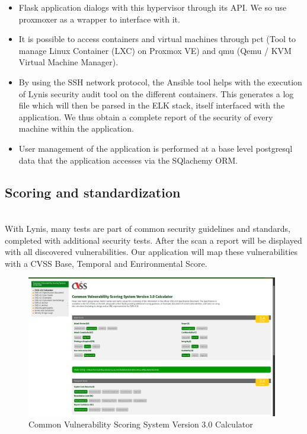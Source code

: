 \begin{itemize}
\item
  Flask application dialogs with this hypervisor through its API. We
  so use proxmoxer as a wrapper to interface with
  it.
\item
  It is possible to access containers and virtual machines through
  pct (Tool to manage Linux Container (LXC) on Proxmox VE) and
  qmu (Qemu / KVM Virtual Machine Manager).
\item
  By using the SSH network protocol, the Ansible tool helps with the execution of
  Lynis security audit tool on the different containers. This generates a
  log file which will then be parsed in the ELK stack, itself
  interfaced with the application. We thus obtain a complete report of the
  security of every machine within the application.
\item
  User management of the application is performed at a base level
  postgresql data that the application accesses via the SQlachemy ORM.
\end{itemize}


\pagebreak

\subsection{Scoring and standardization}

\vspace{1cm}
\\
With Lynis, many tests are part of common security guidelines and standards,
completed with additional security tests. After the scan a report will be displayed
with all discovered vulnerabilities. Our application will map these vulnerabilities with a CVSS Base, Temporal and Enrironmental Score.

\vspace{0.2cm}

\begin{figure}[!h]
  \centering
  \includegraphics[width=0.98\textwidth]{images/cvss.png}
  \caption{Common Vulnerability Scoring System Version 3.0 Calculator}
  \label{ArchitectureSchema}
\end{figure}

